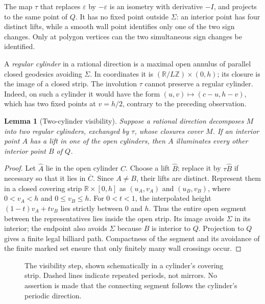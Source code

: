 \documentclass[11pt]{article}
\newtheorem{lemma}{Lemma}
\theoremstyle{remark}
\begin{document}
The map $\tau$ that replaces $\varepsilon$ by $-\varepsilon$ is an isometry
with derivative $-I$, and projects to the same point of $Q$.
It has no fixed point outside $\Sigma$: an interior point has four distinct
lifts, while a smooth wall point identifies only one of the two sign changes.
Only at polygon vertices can the two simultaneous sign changes be identified.

A \emph{regular cylinder} in a rational direction is a maximal open annulus
of parallel closed geodesics avoiding $\Sigma$. In coordinates it is
$(\mathbb R/L\mathbb Z)\times(0,h)$; its closure is the image of a closed strip.
The involution $\tau$ cannot preserve a regular cylinder. Indeed, on such a
cylinder it would have the form $(u,v)\mapsto(c-u,h-v)$, which has two fixed
points at $v=h/2$, contrary to the preceding observation.

\begin{lemma}[Two-cylinder visibility]\label{lem:cylinder}
Suppose a rational direction decomposes $M$ into two regular cylinders,
exchanged by $\tau$, whose closures cover $M$.
If an interior point $A$ has a lift in one of the open cylinders,
then $A$ illuminates every other interior point $B$ of $Q$.
\end{lemma}
\begin{proof}
Let $\widehat A$ lie in the open cylinder $C$. Choose a lift $\widehat B$;
replace it by $\tau\widehat B$ if necessary so that it lies in $\overline C$.
Since $A\ne B$, their lifts are distinct. Represent them in a closed
covering strip $\mathbb R\times[0,h]$ as $(u_A,v_A)$ and $(u_B,v_B)$,
where $0<v_A<h$ and $0\le v_B\le h$. For $0<t<1$, the interpolated
height $(1-t)v_A+tv_B$ lies strictly between $0$ and $h$. Thus the entire
open segment between the representatives lies inside the open strip.
Its image avoids $\Sigma$ in its interior; the endpoint also avoids $\Sigma$
because $B$ is interior to $Q$. Projection to $Q$ gives a finite legal
billiard path. Compactness of the segment and its avoidance of the finite
marked set ensure that only finitely many wall crossings occur.
\end{proof}

\begin{figure}[htbp]
\centering
{}
\caption{The visibility step, shown schematically in a cylinder's covering strip.
Dashed lines indicate repeated periods, not mirrors. No assertion is made
that the connecting segment follows the cylinder's periodic direction.}
\label{fig:strip}
\end{figure}
\end{document}
